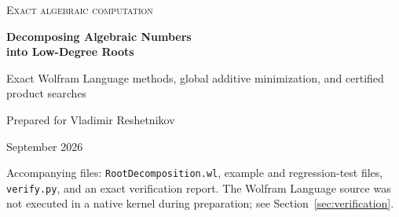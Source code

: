 \documentclass[11pt,letterpaper]{article}
\theoremstyle{definition}\newtheorem{definition}[theorem]{Definition}
\theoremstyle{remark}\newtheorem{remark}[theorem]{Remark}
\newcommand{\WL}[1]{\texttt{#1}}
\begin{document}
\begin{titlepage}
\vspace*{1.1cm}
{\large\scshape Exact algebraic computation\par}
\vspace{.6cm}
{\huge\bfseries\color{ink}Decomposing Algebraic Numbers\\[.18em]into Low-Degree Roots\par}
\vspace{.6cm}
{\Large Exact Wolfram Language methods, global additive minimization, and certified product searches\par}
\vspace{.7cm}
{\large Prepared for Vladimir Reshetnikov\par}
\vspace{.25cm}
{\normalsize September 2026\par}
\vspace{.9cm}
\begin{abstract}
Given an exact algebraic number, one may ask for a representation as a finite sum or product of algebraic numbers that minimizes the largest absolute degree of an individual term. The two degree-nine examples in the original Mathematica question are recovered by exact resultant calculations, and a Galois-theoretic lower bound proves that degree three is globally optimal, even when arbitrarily many terms and fields outside the input field are permitted.

For sums, we prove a finite, complete criterion: it suffices to take rational linear combinations of low-degree subset sums of the input's conjugates. This yields an exhaustive Wolfram Language algorithm without explicit Galois-group or subfield enumeration. For two specified number fields, both sum and product decomposition reduce to rational linear algebra; the product criterion is the nonvanishing of a field-space intersection.

For unrestricted products, the supplied algorithms are certified searches, not a claimed general terminating optimizer. We explain the precise obstruction to a tempting normal-closure reduction, including a degree-eight counterexample whose optimal product degree is four but whose optimal sum degree is eight. The accompanying package, native-kernel test files, and independently executed symbolic and finite-group checks separate mathematical guarantees from implementation-validation status.
\end{abstract}
\vfill
\noindent\small Accompanying files: \WL{RootDecomposition.wl}, example and regression-test files, \WL{verify.py}, and an exact verification report. The Wolfram Language source was not executed in a native kernel during preparation; see Section~\ref{sec:verification}.
\end{titlepage}
\begingroup
\small
\setlength{\parskip}{0pt}
\tableofcontents
\endgroup
\newpage
\end{document}
